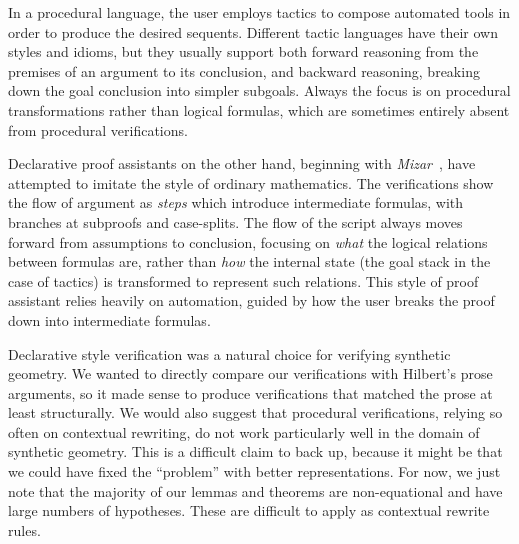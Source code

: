 In a procedural language, the user employs tactics to compose automated tools in order to produce the desired sequents. Different tactic languages have their own styles and idioms, but they usually support both forward reasoning from the premises of an argument to its conclusion, and backward reasoning, breaking down the goal conclusion into simpler subgoals. Always the focus is on procedural transformations rather than logical formulas, which are sometimes entirely absent from procedural verifications. 



Declarative proof assistants on the other hand, beginning with \emph{Mizar}~\cite{MizarMathematicalVernacular}, have attempted to imitate the style of ordinary mathematics. The verifications show the flow of argument as \emph{steps} which introduce intermediate formulas, with branches at subproofs and case-splits. The flow of the script always moves forward from assumptions to conclusion, focusing on \emph{what} the logical relations between formulas are, rather than \emph{how} the internal state (the goal stack in the case of tactics) is transformed to represent such relations. This style of proof assistant relies heavily on automation, guided by how the user breaks the proof down into intermediate formulas.

Declarative style verification was a natural choice for verifying synthetic geometry. We wanted to directly compare our verifications with Hilbert's prose arguments,  so it made sense to produce verifications that matched the prose at least structurally. We would also suggest that procedural verifications, relying so often on contextual rewriting, do not work particularly well in the domain of synthetic geometry. This is a difficult claim to back up, because it might be that we could have fixed the ``problem'' with better representations. For now, we just note that the majority of our lemmas and theorems are non-equational and have large numbers of hypotheses. These are difficult to apply as contextual rewrite rules.

